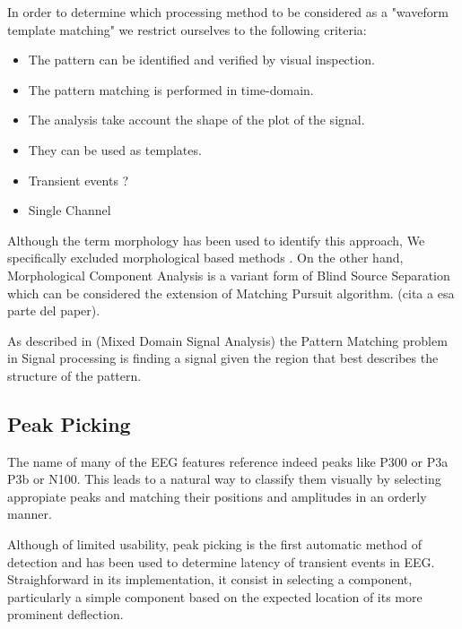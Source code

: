 \documentclass[sensors,article,submit,moreauthors,pdftex,10pt,a4paper]{mdpi}
\begin{document}

In order to determine which  processing method to be considered as a  "waveform template matching" we restrict ourselves to the following criteria:

\begin{itemize}
\item The pattern can be identified and verified by visual inspection.
\item The pattern matching is performed in time-domain.
\item The analysis take account the shape of the plot of the signal.
\item They can be used as templates.
\item Transient events ?
\item Single Channel
\end{itemize}

Although the term morphology has been used to identify this approach, We specifically excluded morphological based methods
\cite{Yamaguchi2009}.  On the other hand, Morphological Component Analysis is a variant form of Blind Source Separation which can be considered the extension of Matching Pursuit algorithm. (cita a esa parte del paper).

As described in (Mixed Domain Signal Analysis) the Pattern Matching problem in Signal processing is finding a signal given the region that best describes the structure of the pattern.

\subsection{Peak Picking}

The name of many of the EEG features reference indeed peaks like P300 or P3a P3b or N100.   This leads to a natural way to classify them visually by selecting appropiate peaks and matching their positions and amplitudes in an orderly manner.

Although of limited usability, peak picking is the first automatic method of detection and has been used to determine latency of transient events in EEG.  Straighforward in its implementation, it consist in selecting a component, particularly a simple component based on the expected location of its more prominent deflection.
\end{document}
